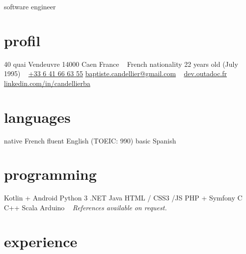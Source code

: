 \documentclass[]{friggeri-cv}
\begin{document}
{software engineer}

\begin{aside}
    \section{profil}
    40 quai Vendeuvre
    14000 Caen
    France
    ~
    French nationality
    22 years old (July 1995)
    ~
    \href{tel:0033641666355}{+33 6 41 66 63 55}
    \href{mailto:baptiste.candellier@gmail.com}{baptiste.candellier@gmail.com}
    ~
    {\href{https://dev.outadoc.fr}{dev.outadoc.fr}}
    {\href{https://www.linkedin.com/in/candellierba/}{linkedin.com/in/candellierba}}
    \section{languages}
    native French
    fluent English (TOEIC: 990)
    basic Spanish
    \section{programming}
    Kotlin + Android 
    Python 3 
    \csharp{} .NET 
    Java 
    HTML / CSS3 /JS 
    PHP + Symfony 
    C 
    C++ 
    Scala 
    Arduino 
    ~
    \textit{References available}
    \textit{on request.}
    \restorecr 
    \obeycr
\end{aside}

\section{experience}
\end{document}
